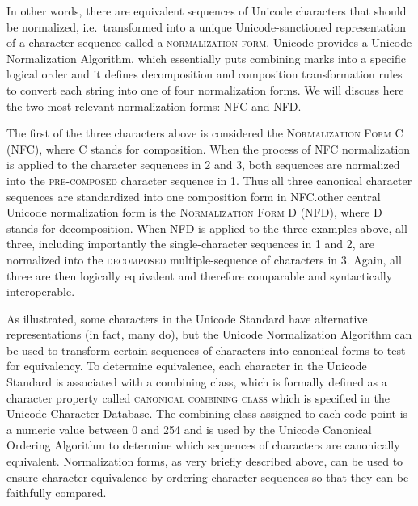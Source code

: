 In other words, there are equivalent sequences of Unicode characters that should
be normalized, i.e.~transformed into a unique Unicode-sanctioned representation
of a character sequence called a \textsc{normalization form}. Unicode provides a
Unicode Normalization Algorithm, which essentially puts combining marks
into a specific logical order and it defines decomposition and composition
transformation rules to convert each string into one of four normalization
forms. We will discuss here the two most relevant normalization forms: NFC and
NFD.\@

The first of the three characters above is considered the \textsc{Normalization
Form C (NFC)}, where \textsc{C} stands for composition. When the process of NFC
normalization is applied to the character sequences in 2 and 3, both sequences
are normalized into the \textsc{pre-composed} character sequence in 1. Thus all
three canonical character sequences are standardized into one composition form
in NFC.\@The other central Unicode normalization form is the
\textsc{Normalization Form D (NFD)}, where \textsc{D} stands for decomposition.
When NFD is applied to the three examples above, all three, including
importantly the single-character sequences in 1 and 2, are normalized into the
\textsc{decomposed} multiple-sequence of characters in 3. Again, all three are
then logically equivalent and therefore comparable and syntactically
interoperable.

As illustrated, some characters in the Unicode Standard have alternative
representations (in fact, many do), but the Unicode Normalization Algorithm can
be used to transform certain sequences of characters into canonical
forms to test for equivalency. To determine equivalence, each
character in the Unicode Standard is associated with a combining class, which is
formally defined as a character property called \textsc{canonical combining
class} which is specified in the Unicode Character Database. The combining class
assigned to each code point is a numeric value between 0 and 254 and is used by
the Unicode Canonical Ordering Algorithm to determine which sequences of
characters are canonically equivalent. Normalization forms, as very briefly
described above, can be used to ensure character equivalence by ordering
character sequences so that they can be faithfully compared.

